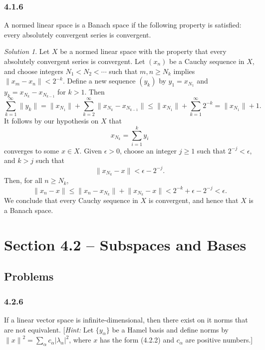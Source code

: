 \documentclass{report}
\newcommand{\norm}[1]{{\lVert #1 \rVert}}
\theoremstyle{remark}
\newtheorem*{solution}{Solution}
\begin{document}
\subsubsection*{4.1.6}
A normed linear space is a Banach space if the following property is satisfied: every absolutely convergent series is convergent.

\begin{solution}
  Let $X$ be a normed linear space with the property that every absolutely convergent series is convergent. Let $(x_n)$ be a Cauchy sequence in $X$, and choose integers $N_1 < N_2 < \dotsm$ such that $m,n \ge N_k$ implies $\norm{x_m - x_n} < 2^{-k}$. Define a new sequence $(y_k)$ by $y_1 = x_{N_1}$ and $y_k = x_{N_k} - x_{N_{k-1}}$ for $k > 1$. Then
  \begin{equation*}
    \sum_{k=1}^\infty \norm{y_k} = \norm{x_{N_1}} + \sum_{k=2}^\infty \norm{x_{N_k} - x_{N_{k-1}}} \le \norm{x_{N_1}} + \sum_{k=1}^\infty 2^{-k} = \norm{x_{N_1}} + 1.
  \end{equation*}
  It follows by our hypothesis on $X$ that
  \begin{equation*}
    x_{N_k} = \sum_{i=1}^k y_i
  \end{equation*}
  converges to some $x \in X$. Given $\epsilon > 0$, choose an integer $j \ge 1$ such that $2^{-j} < \epsilon$, and $k > j$ such that
  \begin{equation*}
    \norm{x_{N_k} - x} < \epsilon - 2^{-j}.
  \end{equation*}
  Then, for all $n \ge N_k$,
  \begin{equation*}
    \norm{x_n - x} \le \norm{x_n - x_{N_k}} + \norm{x_{N_k} - x} < 2^{-k} + \epsilon - 2^{-j} < \epsilon.
  \end{equation*}
  We conclude that every Cauchy sequence in $X$ is convergent, and hence that $X$ is a Banach space.
\end{solution}

\section*{Section 4.2 -- Subspaces and Bases}

\subsection*{Problems}

\subsubsection*{4.2.6}
If a linear vector space is infinite-dimensional, then there exist on it norms that are not equivalent. [\emph{Hint:} Let $\{y_\alpha\}$ be a Hamel basis and define norms by $\norm{x}^2 = \sum_{\alpha} c_\alpha |\lambda_\alpha|^2$, where $x$ has the form (4.2.2) and $c_\alpha$ are positive numbers.]
\end{document}
